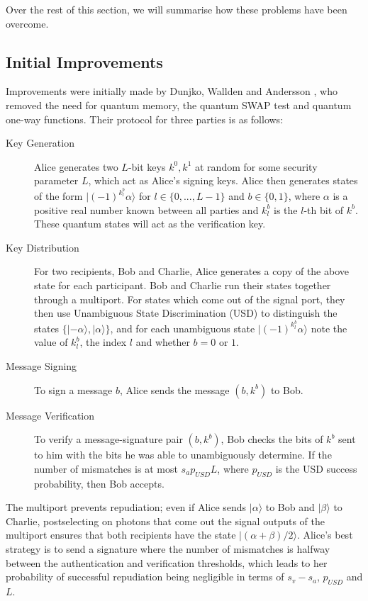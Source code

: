 \documentclass[%
 reprint,
 amsmath,amssymb,
 aps,
 pra,
]{revtex4-1}
\begin{document}
Over the rest of this section, we will summarise how these problems have been overcome.

\subsection{Initial Improvements}
\label{ssec:no-qmem}

Improvements were initially made by Dunjko, Wallden and Andersson \cite{PhysRevLett.112.040502}, who removed the need for quantum memory, the quantum SWAP test and quantum one-way functions. Their protocol for three parties is as follows:

\begin{description}
\item[Key Generation]Alice generates two $L$-bit keys $k^0, k^1$ at random for some security parameter $L$, which act as Alice's signing keys. Alice then generates states of the form $|(-1)^{k^b_l}\alpha\rangle$ for $l \in \{0,...,L-1\}$ and $b \in \{0, 1\}$, where $\alpha$ is a positive real number known between all parties and $k^b_l$ is the $l$-th bit of $k^b$. These quantum states will act as the verification key.
\item[Key Distribution]For two recipients, Bob and Charlie, Alice generates a copy of the above state for each participant. Bob and Charlie run their states together through a multiport. For states which come out of the signal port, they then use Unambiguous State Discrimination (USD) \cite{Ivanovic1987257} to distinguish the states $\{|-\alpha\rangle, |\alpha\rangle\}$, and for each unambiguous state $|(-1)^{k^b_l}\alpha\rangle$ note the value of $k^b_l$, the index $l$ and whether $b = 0$ or $1$.
\item[Message Signing]To sign a message $b$, Alice sends the message $(b, k^b)$ to Bob.
\item[Message Verification]To verify a message-signature pair $(b, k^b)$, Bob checks the bits of $k^b$ sent to him with the bits he was able to unambiguously determine. If the number of mismatches is at most $s_ap_{USD}L$, where $p_{USD}$ is the USD success probability, then Bob accepts.
\end{description}

The multiport prevents repudiation; even if Alice sends $|\alpha\rangle$ to Bob and $|\beta\rangle$ to Charlie, postselecting on photons that come out the signal outputs of the multiport ensures that both recipients have the state $|(\alpha + \beta)/2\rangle$. Alice's best strategy is to send a signature where the number of mismatches is halfway between the authentication and verification thresholds, which leads to her probability of successful repudiation being negligible in terms of $s_v - s_a$, $p_{USD}$ and $L$.
\end{document}
